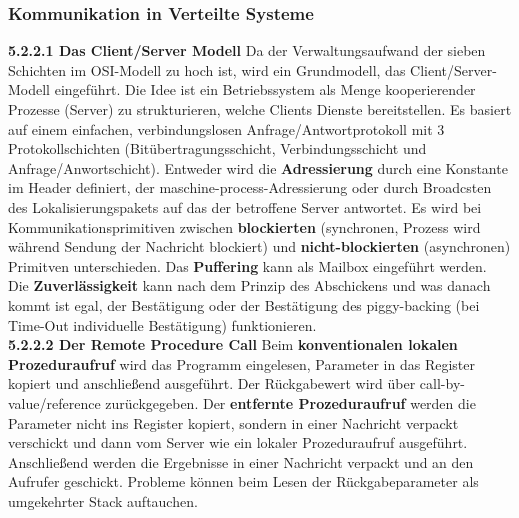 \documentclass{article}
\begin{document}
\subsubsection{Kommunikation in Verteilte Systeme}
    \textbf{5.2.2.1 Das Client/Server Modell}\newline
    Da der Verwaltungsaufwand der sieben Schichten im OSI-Modell zu hoch ist, wird ein Grundmodell, das Client/Server-Modell eingeführt.\newline
    Die Idee ist ein Betriebssystem als Menge kooperierender Prozesse (Server) zu strukturieren, welche Clients Dienste bereitstellen. Es basiert auf einem einfachen, verbindungslosen Anfrage/Antwortprotokoll mit 3 Protokollschichten (Bitübertragungsschicht, Verbindungsschicht und Anfrage/Anwortschicht).\newline
    Entweder wird die \textbf{Adressierung} durch eine Konstante im Header definiert, der maschine-process-Adressierung oder durch Broadcsten des Lokalisierungspakets auf das der betroffene Server antwortet.\newline
    Es wird bei Kommunikationsprimitiven zwischen \textbf{blockierten} (synchronen, Prozess wird während Sendung der Nachricht blockiert) und \textbf{nicht-blockierten} (asynchronen) Primitven unterschieden.\newline
    Das \textbf{Puffering} kann als Mailbox eingeführt werden.\newline
    Die \textbf{Zuverlässigkeit} kann nach dem Prinzip des Abschickens und was danach kommt ist egal, der Bestätigung oder der Bestätigung des piggy-backing (bei Time-Out individuelle Bestätigung) funktionieren.\newline
    \\
    \textbf{5.2.2.2 Der Remote Procedure Call}\newline
    Beim \textbf{konventionalen lokalen Prozeduraufruf} wird das Programm eingelesen, Parameter in das Register kopiert und anschließend ausgeführt. Der Rückgabewert wird über call-by-value/reference zurückgegeben.\newline
    Der \textbf{entfernte Prozeduraufruf} werden die Parameter nicht ins Register kopiert, sondern in einer Nachricht verpackt verschickt und dann vom Server wie ein lokaler Prozeduraufruf ausgeführt. Anschließend werden die Ergebnisse in einer Nachricht verpackt und an den Aufrufer geschickt.\newline
    Probleme können beim Lesen der Rückgabeparameter als umgekehrter Stack auftauchen.\newline
\end{document}
